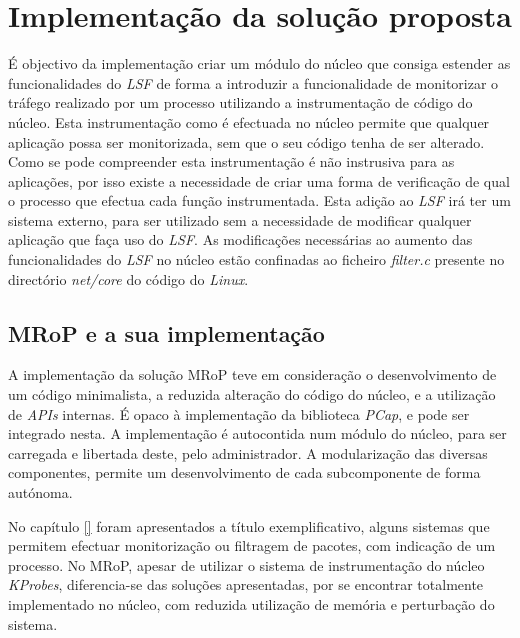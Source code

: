 \chapter{Implementação da solução proposta}
\label{cap:Implementacao}




É objectivo da implementação criar um módulo do núcleo que consiga estender as funcionalidades do \textit{LSF} de forma a introduzir a funcionalidade de monitorizar o tráfego realizado por um processo utilizando a instrumentação de código do núcleo.
Esta instrumentação como é efectuada no núcleo permite que qualquer aplicação possa ser monitorizada, sem que o seu código tenha de ser alterado.
Como se pode compreender esta instrumentação é não instrusiva para as aplicações, por isso existe a necessidade de criar uma forma de verificação de qual o processo que efectua cada função instrumentada.
Esta adição ao \textit{LSF} irá ter um sistema externo, para ser utilizado sem a necessidade de modificar qualquer aplicação que faça uso do \textit{LSF}.
As modificações necessárias ao aumento das funcionalidades do \textit{LSF} no núcleo estão confinadas ao ficheiro \textit{filter.c} presente no directório \textit{net/core} do código do \textit{Linux}.

\section{MRoP e a sua implementação}
\label{sec:mrop_implementation}

A implementação da solução MRoP teve em consideração o desenvolvimento de um código minimalista, a reduzida alteração do código do núcleo, e a utilização de \textit{APIs} internas.
É opaco à implementação da biblioteca \textit{PCap}, e pode ser integrado nesta.
A implementação é autocontida num módulo do núcleo, para ser carregada e libertada deste, pelo administrador.
A modularização das diversas componentes, permite um desenvolvimento de cada subcomponente de forma autónoma.

No capítulo \ref{} foram apresentados a título exemplificativo, alguns sistemas que permitem efectuar monitorização ou filtragem de pacotes, com indicação de um processo.
No MRoP, apesar de utilizar o sistema de instrumentação do núcleo \textit{KProbes}, diferencia-se das soluções apresentadas, por se encontrar totalmente implementado no núcleo, com reduzida utilização de memória e perturbação do sistema.


